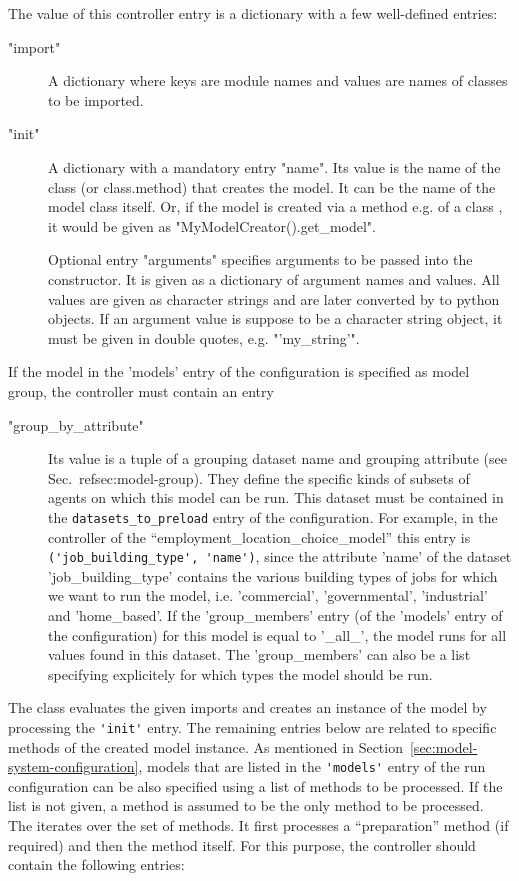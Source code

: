 The value of this controller entry is a dictionary with a few well-defined entries:
\begin{description}
\item["import"] A dictionary where keys are module names and values are names
  of classes to be imported.
\item["init"] A dictionary with a mandatory entry "name". Its value is the
  name of the class (or class.method) that creates the model. It can be the
  name of the model class itself.  Or, if the model is created via   a
  method e.g.  of a class , it would be
  given as "MyModelCreator().get_model".

  Optional entry "arguments" specifies arguments to be passed into the
  constructor. It is given as a dictionary of argument names and values. All
  values are given as character strings and are later converted by
   to python \pythonindex objects. If an argument value is suppose to be
  a character string object, it must be given in double quotes, e.g.
  "'my_string'".
\end{description}
If the model in the 'models' entry of the configuration is specified as model group, the controller must contain 
an entry
\begin{description}
\item["group_by_attribute"] Its value is a tuple of a grouping dataset name and grouping attribute (see Sec.~ref{sec:model-group}).
They define the specific kinds of 
subsets of agents on which this model can be run. This dataset must be contained in the 
\verb|datasets_to_preload| entry of the configuration. For example, in the controller of the 
``employment_location_choice_model'' this entry is
\verb|('job_building_type', 'name')|, since the attribute 'name' of the dataset 'job_building_type' contains the various
building types of jobs for which we want to run the model, i.e. 'commercial', 'governmental', 'industrial' and 'home_based'.
If the 'group_members' entry (of the 'models' entry of the configuration) for this model is equal to '_all_', the model runs 
for all values found in this dataset. The  'group_members' can also be a list specifying explicitely for which types the model 
should be run. 
\end{description}

The  class evaluates the given imports and creates an
instance of the model by processing the \verb|'init'| entry. The remaining entries
below are related to specific methods of the created model instance.  As
mentioned in Section~\ref{sec:model-system-configuration}, models \modelsindex
that are listed in the \verb|'models'| entry of the run configuration can be also
specified using a list of methods to be processed. If the list is not given, a
method  is assumed to be the only method to be processed. The
 iterates over the set of methods. It first processes a
``preparation'' method (if required) and then the method itself. For this purpose,
the controller should contain the following entries:

